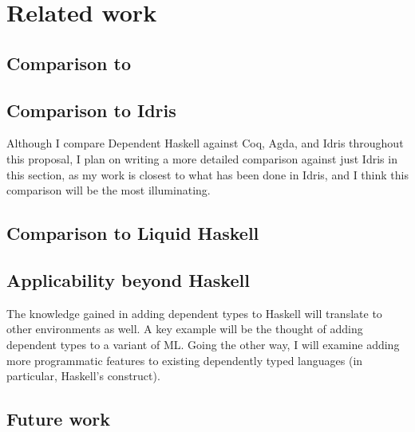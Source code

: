 \chapter{Related work}
\label{cha:related}

\section{Comparison to \citet{gundry-thesis}}

\section{Comparison to Idris}

\begin{proposal}
Although I compare Dependent Haskell against Coq, Agda, and Idris throughout
this proposal, I plan on writing a more detailed comparison against just Idris
in this section, as my work is closest to what has been done in Idris, and I
think this comparison will be the most illuminating.
\end{proposal}

\section{Comparison to Liquid Haskell}

\section{Applicability beyond Haskell}

\begin{proposal}
The knowledge gained in adding dependent types to Haskell will translate
to other environments as well. A key example will be the thought of adding
dependent types to a variant of ML. Going the other way, I will examine
adding more programmatic features to existing dependently typed languages
(in particular, Haskell's  construct).
\end{proposal}

\section{Future work}

